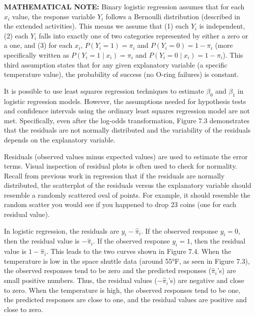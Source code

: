 \documentclass[
]{report}
\begin{document}
\large

\textbf{MATHEMATICAL NOTE:}
Binary logistic regression assumes that for each \(x_i\) value, the response variable \(Y_i\) follows a Bernoulli distribution (described in the extended activities). This means we assume that (1) each \(Y_i\) is independent, (2) each \(Y_i\) falls into exactly one of two categories represented by either a zero or a one, and (3) for each \(x_i\), \(P(Y_i = 1) = \pi_i\) and \(P(Y_i = 0) = 1 - \pi_i\) (more specifically written as \(P(Y_i = 1 \mid x_i) = \pi_i\) and \(P(Y_i = 0 \mid x_i) = 1 - \pi_i\)). This third assumption states that for any given explanatory variable (a specific temperature value), the probability of success (no O-ring failures) is constant.
\normalsize 

It is possible to use least squares regression techniques to estimate \(\beta_0\) and \(\beta_1\) in logistic regression models. However, the assumptions needed for hypothesis tests and confidence intervals using the ordinary least squares regression model are not met. Specifically, even after the log-odds transformation, Figure 7.3 demonstrates that the residuals are not normally distributed and the variability of the residuals depends on the explanatory variable.

Residuals (observed values minus expected values) are used to estimate the error terms. Visual inspection of residual plots is often used to check for normality. Recall from previous work in regression that if the residuals are normally distributed, the scatterplot of the residuals versus the explanatory variable should resemble a randomly scattered oval of points. For example, it should resemble the random scatter you would see if you happened to drop 23 coins (one for each residual value).

In logistic regression, the residuals are \(y_i - \hat\pi_i\). If the observed response \(y_i = 0\), then the residual value is \(-\hat\pi_i\). If the observed response \(y_i = 1\), then the residual value is \(1 - \hat\pi_i\). This leads to the two curves shown in Figure 7.4. When the temperature is low in the space shuttle data (around 55°F, as seen in Figure 7.3), the observed responses tend to be zero and the predicted responses (\(\hat\pi_i\)'s) are small positive numbers. Thus, the residual values (\(-\hat\pi_i\)'s) are negative and close to zero. When the temperature is high, the observed responses tend to be one, the predicted responses are close to one, and the residual values are positive and close to zero.
\end{document}
